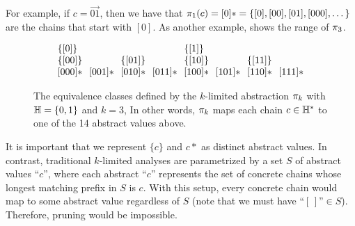 For example, if $c = \vec{01}$,
then we have that $\pi_1(c) = [0]* = \{ [0], [00], [01], [000], \dots \}$
are the chains that start with $[0]$.
As another example,  shows the range of $\pi_3$.

\begin{figure}
\[
\arraycolsep=3.5pt
\begin{array}{llllllll}
\{\vec{0}\}    &            &              &            & \{\vec{1}\} \\
\{\vec{00}\}   &            & \{\vec{01}\} &            & \{\vec{10}\} &            & \{\vec{11}\} \\
\vec{000}*     & \vec{001}* & \vec{010}*   & \vec{011}* & \vec{100}*   & \vec{101}* & \vec{110}* & \vec{111}*
\end{array}
\]
\caption{\label{fig:repeatingExample}
The equivalence classes defined by the $k$-limited abstraction $\pi_k$
with ${\mathbb H} = \{ 0, 1 \}$ and $k = 3$,
In other words, $\pi_k$ maps each chain $c \in {\mathbb H}^*$ to one of the 14 abstract values above.
}
\end{figure}

It is important that we represent $\{c\}$ and $c*$ as distinct abstract values.
In contrast, traditional $k$-limited analyses are parametrized by a set $S$ of abstract values ``$c$'',
where each abstract ``$c$'' represents the set of concrete chains whose longest
matching prefix in $S$ is $c$.
With this setup,
every concrete chain would map to some abstract value regardless of $S$
(note that we must have $\text{``$[\,]$''} \in S$).
Therefore, pruning would be impossible.



